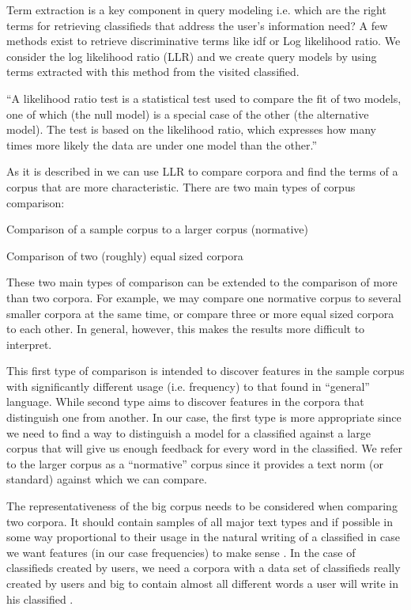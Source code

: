 Term extraction is a key component in query modeling i.e. which are the right terms for retrieving classifieds that address the user's information need? A few methods exist to retrieve discriminative terms like idf or Log likelihood ratio. We consider the log likelihood ratio (LLR) and we create query models by using terms extracted with this method from the visited classified.

``A likelihood ratio test is a statistical test used to compare the fit of two models, one of which (the null model) is a special case of the other (the alternative model). The test is based on the likelihood ratio, which expresses how many times more likely the data are under one model than the other.''

As it is described in \cite{RaysonGarside} we can use LLR to compare corpora and find the terms of a corpus that are more characteristic. There are two main types of corpus comparison:

\begin{list}{.}{}
\item Comparison of a sample corpus to a larger corpus (normative)
\item Comparison of two (roughly) equal sized corpora
\end{list}

These two main types of comparison can be extended to the comparison of more than two corpora. For example, we may compare one normative corpus to several smaller corpora at the same time, or compare three or more equal sized corpora to each other. In general, however, this makes the results more difficult to interpret.

This first type of comparison is intended to discover features in the sample corpus with significantly different usage (i.e. frequency) to that found in ``general'' language. While second type aims to discover features in the corpora that distinguish one from another. In our case, the first type is more appropriate since we need to find a way to distinguish a model for a classified against a large corpus that will give us enough feedback for every word in the classified. We refer to the larger corpus as a ``normative'' corpus since it provides a text norm (or standard) against which we can compare.

The representativeness of the big corpus needs to be considered when comparing two corpora. It should contain samples of all major text types and if possible in some way proportional to their usage in the natural writing of a classified in case we want features (in our case frequencies) to make sense . In the case of classifieds created by users, we need a corpora with a data set of classifieds really created by users and big to contain almost all different words a user will write in his classified \cite{RaysonGarside}.

